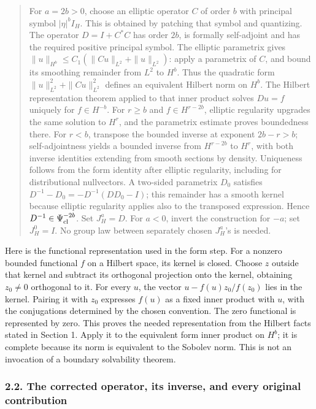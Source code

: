\documentclass[
  11pt,
]{article}
\begin{document}
\begin{quote}
For \(a=2b>0\), choose an elliptic operator \(C\) of order \(b\) with
principal symbol \(|\eta|^b I_H\). This is obtained by patching that
symbol and quantizing. The operator \(D=I+C^*C\) has order \(2b\), is
formally self-adjoint and has the required positive principal symbol.
The elliptic parametrix gives
\(\|u\|_{H^b}\leq C_1(\|Cu\|_{L^2}+\|u\|_{L^2})\): apply a parametrix of
\(C\), and bound its smoothing remainder from \(L^2\) to \(H^b\). Thus
the quadratic form \(\|u\|_{L^2}^2+\|Cu\|_{L^2}^2\) defines an
equivalent Hilbert norm on \(H^b\). The Hilbert representation theorem
applied to that inner product solves \(Du=f\) uniquely for
\(f\in H^{-b}\). For \(r\geq b\) and \(f\in H^{r-2b}\), elliptic
regularity upgrades the same solution to \(H^r\), and the parametrix
estimate proves boundedness there. For \(r<b\), transpose the bounded
inverse at exponent \(2b-r>b\); self-adjointness yields a bounded
inverse from \(H^{r-2b}\) to \(H^r\), with both inverse identities
extending from smooth sections by density. Uniqueness follows from the
form identity after elliptic regularity, including for distributional
nullvectors. A two-sided parametrix \(D_0\) satisfies
\(D^{-1}-D_0=-D^{-1}(DD_0-I)\); this remainder has a smooth kernel
because elliptic regularity applies also to the transposed expression.
Hence \(D^{-1}\in\Psi^{-2b}_{\rm cl}\). Set \(J_H^a=D\). For \(a<0\),
invert the construction for \(-a\); set \(J_H^0=I\). No group law
between separately chosen \(J_H^a\)'s is needed.
\end{quote}

Here is the functional representation used in the form step. For a
nonzero bounded functional \(f\) on a Hilbert space, its kernel is
closed. Choose \(z\) outside that kernel and subtract its orthogonal
projection onto the kernel, obtaining \(z_0\ne0\) orthogonal to it. For
every \(u\), the vector \(u-f(u)z_0/f(z_0)\) lies in the kernel. Pairing
it with \(z_0\) expresses \(f(u)\) as a fixed inner product with \(u\),
with the conjugations determined by the chosen convention. The zero
functional is represented by zero. This proves the needed representation
from the Hilbert facts stated in Section 1. Apply it to the equivalent
form inner product on \(H^b\); it is complete because its norm is
equivalent to the Sobolev norm. This is not an invocation of a boundary
solvability theorem.

\subsubsection{2.2. The corrected operator, its inverse, and every
original
contribution}\label{the-corrected-operator-its-inverse-and-every-original-contribution}
\end{document}
